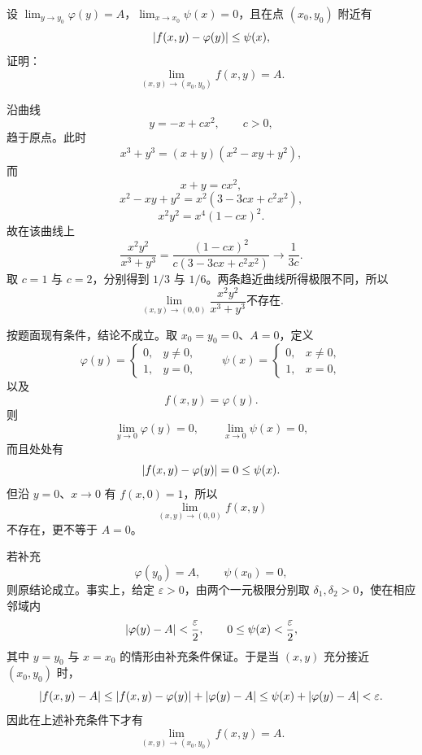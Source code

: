 \begin{xexercise}[6]
设 $\displaystyle\lim_{y\to y_0}\varphi(y)=A$，$\displaystyle\lim_{x\to x_0}\psi(x)=0$，且在点 $(x_0,y_0)$ 附近有
  \[
    \lvert f(x,y)-\varphi(y)\rvert\le\psi(x),
  \]
  证明：
  \[
    \lim_{(x,y)\to(x_0,y_0)}f(x,y)=A.
  \]
\end{xexercise}
\begin{xsolution}
沿曲线
\[
  y=-x+cx^2,
  \qquad c>0,
\]
趋于原点。此时
\[
  x^3+y^3=(x+y)(x^2-xy+y^2),
\]
而
\[
  x+y=cx^2,
\]
\[
  x^2-xy+y^2=x^2(3-3cx+c^2x^2),
\]
\[
  x^2y^2=x^4(1-cx)^2.
\]
故在该曲线上
\[
  \frac{x^2y^2}{x^3+y^3}
  =\frac{(1-cx)^2}{c(3-3cx+c^2x^2)}
  \longrightarrow\frac1{3c}.
\]
取 $c=1$ 与 $c=2$，分别得到 $1/3$ 与 $1/6$。两条趋近曲线所得极限不同，所以
\[
  \boxed{\displaystyle
  \lim_{(x,y)\to(0,0)}\frac{x^2y^2}{x^3+y^3}
  \text{不存在}}.
\]

按题面现有条件，结论不成立。取 $x_0=y_0=0$、$A=0$，定义
\[
  \varphi(y)=
  \begin{cases}
    0, & y\ne0,\\
    1, & y=0,
  \end{cases}
  \qquad
  \psi(x)=
  \begin{cases}
    0, & x\ne0,\\
    1, & x=0,
  \end{cases}
\]
以及
\[
  f(x,y)=\varphi(y).
\]
则
\[
  \lim_{y\to0}\varphi(y)=0,
  \qquad
  \lim_{x\to0}\psi(x)=0,
\]
而且处处有
\[
  \lvert f(x,y)-\varphi(y)\rvert=0\le\psi(x).
\]
但沿 $y=0$、$x\to0$ 有 $f(x,0)=1$，所以
\[
  \lim_{(x,y)\to(0,0)}f(x,y)
\]
不存在，更不等于 $A=0$。

若补充
\[
  \varphi(y_0)=A,
  \qquad
  \psi(x_0)=0,
\]
则原结论成立。事实上，给定 $\varepsilon>0$，由两个一元极限分别取 $\delta_1,\delta_2>0$，使在相应邻域内
\[
  \lvert\varphi(y)-A\rvert<\frac\varepsilon2,
  \qquad
  0\le\psi(x)<\frac\varepsilon2,
\]
其中 $y=y_0$ 与 $x=x_0$ 的情形由补充条件保证。于是当 $(x,y)$ 充分接近 $(x_0,y_0)$ 时，
\[
  \lvert f(x,y)-A\rvert
  \le\lvert f(x,y)-\varphi(y)\rvert+\lvert\varphi(y)-A\rvert
  \le\psi(x)+\lvert\varphi(y)-A\rvert
  <\varepsilon.
\]
因此在上述补充条件下才有
\[
  \lim_{(x,y)\to(x_0,y_0)}f(x,y)=A.
\]
\end{xsolution}


